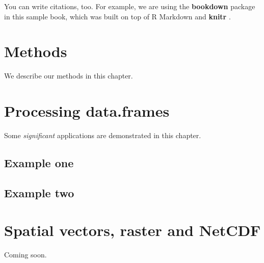 \documentclass[]{book}
\begin{document}
You can write citations, too. For example, we are using the \textbf{bookdown} package \citep{R-bookdown} in this sample book, which was built on top of R Markdown and \textbf{knitr} \citep{xie2015}.

\hypertarget{methods}{%
\chapter{Methods}\label{methods}}

We describe our methods in this chapter.

\hypertarget{processing-data.frames}{%
\chapter{Processing data.frames}\label{processing-data.frames}}

Some \emph{significant} applications are demonstrated in this chapter.

\hypertarget{example-one}{%
\section{Example one}\label{example-one}}

\hypertarget{example-two}{%
\section{Example two}\label{example-two}}

\hypertarget{spatial-vectors-raster-and-netcdf}{%
\chapter{Spatial vectors, raster and NetCDF}\label{spatial-vectors-raster-and-netcdf}}

Coming soon.


\end{document}
